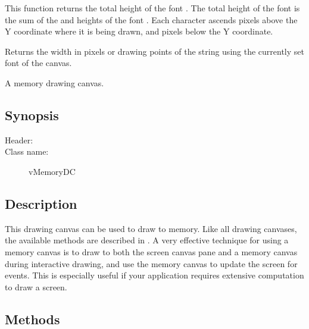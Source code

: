 
This function returns the total height of the font .
The total height of the font is the sum of the  and
 heights of the font . Each character
ascends  pixels above the Y coordinate where it is
being drawn, and  pixels below the Y coordinate.


Returns the width in pixels or drawing points of the string
 using the currently set font of the canvas.


A memory drawing canvas.

\subsection* {Synopsis}

\begin{description}
	\item [Header:] 
	\item [Class name:] vMemoryDC
\end{description}

\subsection* {Description}

This drawing canvas can be used to draw to memory. Like
all drawing canvases, the available methods are described
in . A very effective technique for using a memory
canvas is to draw to both the screen canvas pane and a memory
canvas during interactive drawing, and use the memory canvas to
update the screen for  events. This is especially
useful if your application requires extensive computation to
draw a screen.

\subsection* {Methods}


